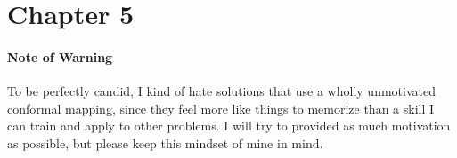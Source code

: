 \section{Chapter 5}

\paragraph{Note of Warning}
To be perfectly candid, I kind of hate solutions that use a wholly unmotivated conformal mapping,
since they feel more like things to memorize than a skill I can train and apply to other problems.
I will try to provided as much motivation as possible, but please keep this mindset of mine in mind.

\begin{enumerate}[wide, labelindent=0pt, label=\arabic*.]

    
    
    
    

\end{enumerate}
